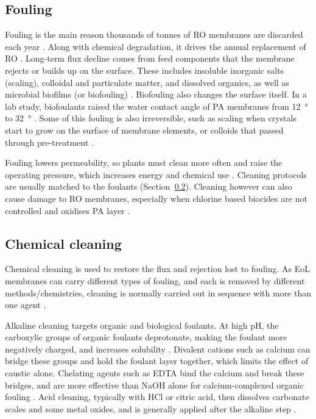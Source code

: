 \subsection{Fouling}
\label{sec:fouling}
Fouling is the main reason thousands of tonnes of RO membranes are discarded each year \citep{GarciaPacheco2015}. Along with chemical degradation, it drives the annual replacement of RO \citep{LejarazuLarranaga2022}. Long-term flux decline comes from feed components that the membrane rejects or builds up on the surface. These includes insoluble inorganic salts (scaling), colloidal and particulate matter, and dissolved organics, as well as microbial biofilms (or biofouling) \citep{MohiuddinAhmed2010}. Biofouling also changes the surface itself. In a lab study, biofoulants raised the water contact angle of PA membranes from \qty{12}{\degree} to \qty{32}{\degree} \citep{MohiuddinAhmed2010}. Some of this fouling is also irreversible, such as scaling when crystals start to grow on the surface of membrane elements, or colloids that passed through pre-treatment \citep{Greenlee2009}. 

Fouling lowers permeability, so plants must clean more often and raise the operating pressure, which increases energy and chemical use \citep{LejarazuLarranaga2022}. Cleaning protocols are usually matched to the foulants (Section~\ref{sec:lit-cleaning}). Cleaning however can also cause damage to RO membranes, especially when chlorine based biocides are not controlled and oxidises PA layer \citep{LejarazuLarranaga2022}.


\subsection{Chemical cleaning}
\label{sec:lit-cleaning}
Chemical cleaning is used to restore the flux and rejection lost to fouling. As EoL membranes can carry different types of fouling, and each is removed by different methods/chemistries, cleaning is normally carried out in sequence with more than one agent \citep{DuPont2026}.

Alkaline cleaning targets organic and biological foulants. At high pH, the carboxylic groups of organic foulants deprotonate, making the foulant more negatively charged, and increases solubility \citep{Ang2006}. Divalent cations such as calcium can bridge these groups and hold the foulant layer together, which limits the effect of caustic alone. Chelating agents such as EDTA bind the calcium and break these bridges, and are more effective than NaOH alone for calcium-complexed organic fouling \citep{Ang2006, elimelech2005chemical}. Acid cleaning, typically with HCl or citric acid, then dissolves carbonate scales and some metal oxides, and is generally applied after the alkaline step \citep{DuPont2026}. \\

